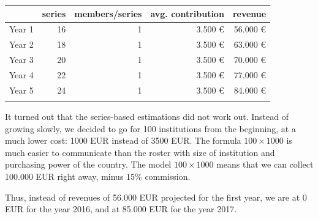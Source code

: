 \documentclass[output=guidelines,nonflat,smallfont,
draftmode
]{langsci/langscibook}
\newcommand{\evaluation}[1]{
  \renewcommand{\tblslinecolour}{lsLightOrange}
  \tblssy{receipt}{Evaluation}{\vspace*{-5mm}#1}
}
\renewcommand{\tblssy}[4][black!12]{%
  \renewcommand{\langscisymbol}{#2}\renewcommand{\tblsboxcolor}{#1}
  \begin{mdframed}[style=yellowexercise,frametitle={#3}]
    #4
  \end{mdframed}
}
\begin{document}
{\noindent
\begin{tabularx}{\textwidth}{Xrrrr}
\lsptoprule
        &  series&  members/series&       avg. contribution &     revenue\\
\midrule
Year 1 &  16               &       1                                    &        3.500 €                                               &     56.000 €                                     \\
Year 2 &  18               &       1                                    &        3.500 €                                               &     63.000 €                                     \\
Year 3 &  20               &       1                                    &        3.500 €                                               &     70.000 €                                     \\
Year 4 &  22               &       1                                    &        3.500 €                                               &     77.000 €                                     \\
Year 5 &  24               &       1                                    &        3.500 €                                               &     84.000 €                                     \\
\lspbottomrule
\end{tabularx}
}
\evaluation{
It turned out that the series-based estimations did not work out. Instead of growing slowly, we decided to go for 100 institutions from the beginning, at a much lower cost: 1000 EUR instead of 3500 EUR. The formula $100 \times 1000$ is much easier to communicate than the roster with size of institution and purchasing power of the country. The model $100 \times 1000$ means that we can collect 100.000 EUR right away, minus 15\% commission. 

Thus, instead of revenues of 56.000 EUR projected for the first year, we are at 0 EUR for the year 2016, and at 85.000 EUR for the year 2017. 
}

\newpage 
\end{document}
